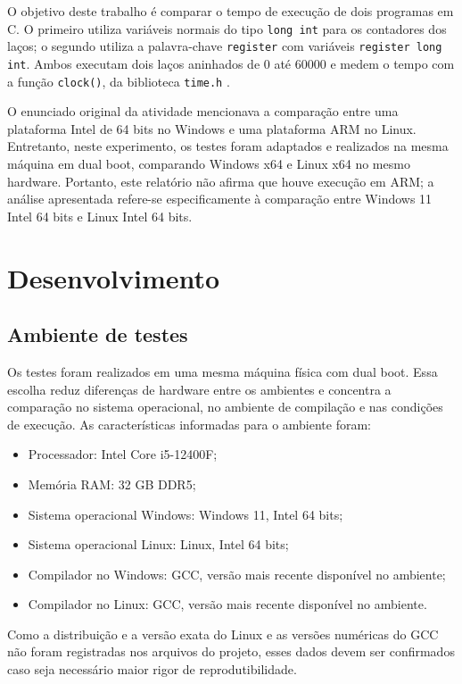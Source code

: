 \documentclass[12pt,oneside,a4paper,brazil]{abntex2}
\begin{document}
O objetivo deste trabalho é comparar o tempo de execução de dois programas em C. O primeiro utiliza variáveis normais do tipo \texttt{long int} para os contadores dos laços; o segundo utiliza a palavra-chave \texttt{register} com variáveis \texttt{register long int}. Ambos executam dois laços aninhados de 0 até 60000 e medem o tempo com a função \texttt{clock()}, da biblioteca \texttt{time.h} \cite{kernighan1988c,cppreference_clock}.

O enunciado original da atividade mencionava a comparação entre uma plataforma Intel de 64 bits no Windows e uma plataforma ARM no Linux. Entretanto, neste experimento, os testes foram adaptados e realizados na mesma máquina em dual boot, comparando Windows x64 e Linux x64 no mesmo hardware. Portanto, este relatório não afirma que houve execução em ARM; a análise apresentada refere-se especificamente à comparação entre Windows 11 Intel 64 bits e Linux Intel 64 bits.

\chapter{Desenvolvimento}

\section{Ambiente de testes}

Os testes foram realizados em uma mesma máquina física com dual boot. Essa escolha reduz diferenças de hardware entre os ambientes e concentra a comparação no sistema operacional, no ambiente de compilação e nas condições de execução. As características informadas para o ambiente foram:

\begin{itemize}
    \item Processador: Intel Core i5-12400F;
    \item Memória RAM: 32 GB DDR5;
    \item Sistema operacional Windows: Windows 11, Intel 64 bits;
    \item Sistema operacional Linux: Linux, Intel 64 bits;
    \item Compilador no Windows: GCC, versão mais recente disponível no ambiente;
    \item Compilador no Linux: GCC, versão mais recente disponível no ambiente.
\end{itemize}

Como a distribuição e a versão exata do Linux e as versões numéricas do GCC não foram registradas nos arquivos do projeto, esses dados devem ser confirmados caso seja necessário maior rigor de reprodutibilidade.
\end{document}
